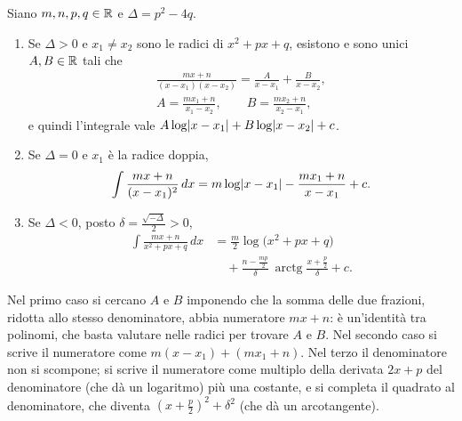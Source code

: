 \begin{proposizione}
\label{prop:razionali-secondo-grado}
Siano $m,n,p,q\in\mathbb{R}$ e $\Delta=p^{2}-4q$.
\begin{enumerate}[label=\textup{(\roman*)}]
  \item Se $\Delta>0$ e $x_{1}\neq x_{2}$ sono le radici di $x^{2}+px+q$, esistono e sono unici
  $A,B\in\mathbb{R}$ tali che
  \begin{equation}\label{eq:fratti-semplici-distinte}
  \begin{gathered}
    \frac{mx+n}{(x-x_{1})(x-x_{2})}=\frac A{x-x_{1}}+\frac B{x-x_{2}},\\
    A=\frac{mx_{1}+n}{x_{1}-x_{2}}, \qquad B=\frac{mx_{2}+n}{x_{2}-x_{1}},
  \end{gathered}
  \end{equation}
  e quindi l'integrale vale $A\log\lvert x-x_{1}\rvert+B\log\lvert x-x_{2}\rvert+c$.
  \item Se $\Delta=0$ e $x_{1}$ è la radice doppia,
  \begin{equation}\label{eq:fratti-semplici-doppia}
    \int\frac{mx+n}{(x-x_{1})^{2}}\,dx=m\log\lvert x-x_{1}\rvert-\frac{mx_{1}+n}{x-x_{1}}+c .
  \end{equation}
  \item Se $\Delta<0$, posto $\delta=\frac{\sqrt{-\Delta}}2>0$,
  \begin{equation}\label{eq:fratti-semplici-complesse}
  \begin{split}
    \int\frac{mx+n}{x^{2}+px+q}\,dx&=\frac m2\log\bigl(x^{2}+px+q\bigr)\\
    &\quad+\frac{n-\frac{mp}2}{\delta}\,\operatorname{arctg}\frac{x+\frac p2}\delta+c .
  \end{split}
  \end{equation}
\end{enumerate}
\end{proposizione}

\begin{schema}
\end{schema}

\begin{strategia}
Nel primo caso si cercano $A$ e $B$ imponendo che la somma delle due frazioni, ridotta
allo stesso denominatore, abbia numeratore $mx+n$: è un'identità tra polinomi, che basta
valutare nelle radici per trovare $A$ e $B$. Nel secondo caso si scrive il numeratore come
$m(x-x_{1})+(mx_{1}+n)$. Nel terzo il denominatore non si scompone; si scrive il numeratore
come multiplo della derivata $2x+p$ del denominatore (che dà un logaritmo) più una
costante, e si completa il quadrato al denominatore, che diventa $(x+\frac p2)^{2}+\delta^{2}$
(che dà un arcotangente).
\end{strategia}

